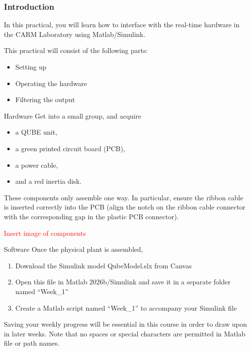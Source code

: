 \documentclass[9pt]{beamer-control}
\begin{document}

\begin{frame}
\frametitle{Introduction}
In this practical, you will learn how to interface with the real-time hardware in the CARM Laboratory using Matlab/Simulink.

\vfill

This practical will consist of the following parts:
\begin{itemize}
\item Setting up
\item Operating the hardware
\item Filtering the output
\end{itemize}
\end{frame}


\begin{frame}{Hardware}
Get into a small group, and acquire 
\begin{itemize}
	\item a QUBE unit,
	\item a green printed circuit board (PCB),
	\item a power cable,
	\item and a red inertia disk.
\end{itemize}  

These components only assemble one way. In particular, ensure the ribbon cable is inserted correctly into the PCB (align the notch on the ribbon cable connector with the corresponding gap in the plastic PCB connector).

\textcolor{red}{Insert image of components}


\end{frame}


\begin{frame}{Software}
Once the physical plant is assembled, 
\begin{enumerate}
\item Download the Simulink model QubeModel.slx from Canvas
\item Open this file in Matlab 2026b/Simulink and save it in a separate folder named “Week\_1”
\item Create a Matlab script named “Week\_1” to accompany your Simulink file
\end{enumerate}

Saving your weekly progress will be essential in this course in order to draw upon in later weeks. Note that no spaces or special characters are permitted in Matlab file or path names.

\end{frame}
\end{document}
